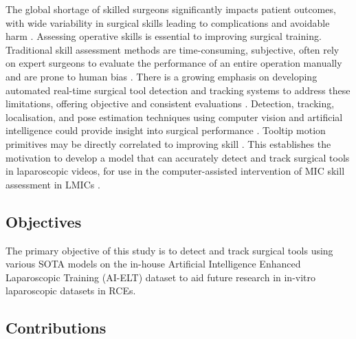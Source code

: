 The global shortage of skilled surgeons significantly impacts patient outcomes, with wide variability in surgical skills leading to complications and avoidable harm \cite{jin_tool_2018}. Assessing operative skills is essential to improving surgical training. Traditional skill assessment methods are time-consuming, subjective, often rely on expert surgeons to evaluate the performance of an entire operation manually \cite{vassiliou_global_2005, paley_crowdsourced_2021} and are prone to human bias \cite{levin_automated_2019}. There is a growing emphasis on developing automated real-time surgical tool detection and tracking systems to address these limitations, offering objective and consistent evaluations \cite{loza_realtime_2024}. Detection, tracking, localisation, and pose estimation techniques using computer vision and artificial intelligence could provide insight into surgical performance \cite{bodenstedt_comparative_2018, allan_toward_2013, constable_enhancing_2024}. Tooltip motion primitives may be directly correlated to improving skill \cite{retrosi_motion_2015}. This establishes the motivation to develop a model that can accurately detect and track surgical tools in laparoscopic videos, for use in the computer-assisted intervention of MIC skill assessment in LMICs \cite{nwoye_cholectrack20_2023}. 

\subsection{Objectives}

The primary objective of this study is to detect and track surgical tools using various SOTA models on the in-house Artificial Intelligence Enhanced Laparoscopic Training (AI-ELT) dataset to aid future research in in-vitro laparoscopic datasets in RCEs.

\subsection{Contributions}

